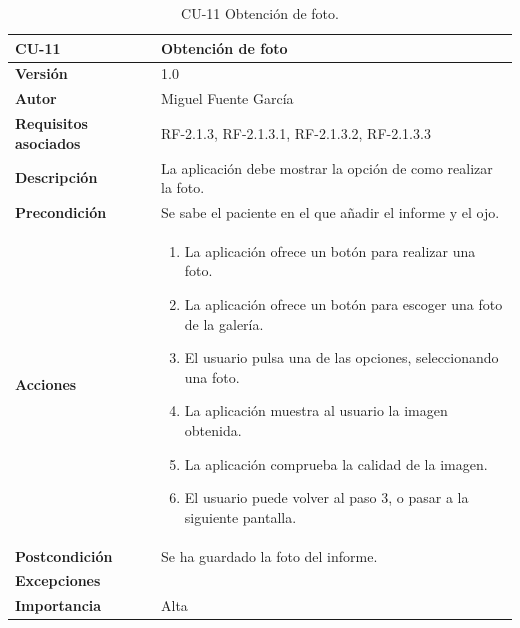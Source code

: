 \begin{table}[p]
	\centering
	\begin{tabularx}{\linewidth}{ p{} p{} }
		\toprule
		\textbf{CU-11}    & \textbf{Obtención de foto}\\
		\toprule
		\textbf{Versión}              & 1.0    \\
		\textbf{Autor}                & Miguel Fuente García \\
		\textbf{Requisitos asociados} & RF-2.1.3, RF-2.1.3.1, RF-2.1.3.2, RF-2.1.3.3 \\
		\textbf{Descripción}          & La aplicación debe mostrar la opción de como realizar la foto. \\
		\textbf{Precondición}         & Se sabe el paciente en el que añadir el informe y el ojo. \\
		\textbf{Acciones}             &
		\begin{enumerate}
			\def\labelenumi{\arabic{enumi}.}
			\tightlist
			\item La aplicación ofrece un botón para realizar una foto.
            \item La aplicación ofrece un botón para escoger una foto de la galería.
            \item El usuario pulsa una de las opciones, seleccionando una foto.
            \item La aplicación muestra al usuario la imagen obtenida.
            \item La aplicación comprueba la calidad de la imagen.
            \item El usuario puede volver al paso 3, o pasar a la siguiente pantalla.
		\end{enumerate}\\
		\textbf{Postcondición}        & Se ha guardado la foto del informe. \\
		\textbf{Excepciones}          &  \\
		\textbf{Importancia}          & Alta  \\
		\bottomrule
	\end{tabularx}
	\caption{CU-11 Obtención de foto.}
\end{table}

